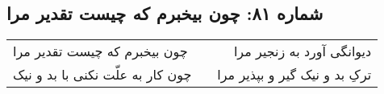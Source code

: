 \begin{center}
\section*{شماره ۸۱: چون بیخبرم که چیست تقدیر مرا}
\label{sec:081}
\begin{longtable}{l p{0.5cm} r}
چون بیخبرم که چیست تقدیر مرا
&&
دیوانگی آورد به زنجیر مرا
\\
چون کار به علّت نکنی با بد و نیک
&&
ترکِ بد و نیک گیر و بپذیر مرا
\\
\end{longtable}
\end{center}
